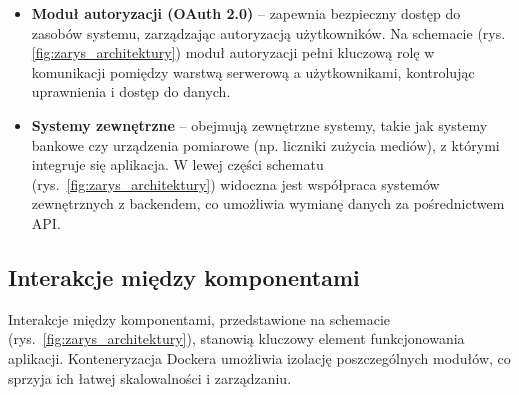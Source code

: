 \begin{itemize}
    \item \textbf{Moduł autoryzacji (OAuth 2.0)} – zapewnia bezpieczny dostęp do zasobów systemu, zarządzając autoryzacją użytkowników. Na schemacie (rys. \ref{fig:zarys_architektury}) moduł autoryzacji pełni kluczową rolę w komunikacji pomiędzy warstwą serwerową a użytkownikami, kontrolując uprawnienia i dostęp do danych.

    \item \textbf{Systemy zewnętrzne} – obejmują zewnętrzne systemy, takie jak systemy bankowe czy urządzenia pomiarowe (np. liczniki zużycia mediów), z którymi integruje się aplikacja. W lewej części schematu (rys.~\ref{fig:zarys_architektury}) widoczna jest współpraca systemów zewnętrznych z backendem, co umożliwia wymianę danych za pośrednictwem API.
		
\end{itemize}  


\subsection{Interakcje między komponentami}

Interakcje między komponentami, przedstawione na schemacie (rys.~\ref{fig:zarys_architektury}), stanowią kluczowy element funkcjonowania aplikacji. Konteneryzacja Dockera umożliwia izolację poszczególnych modułów, co sprzyja ich łatwej skalowalności i zarządzaniu.

